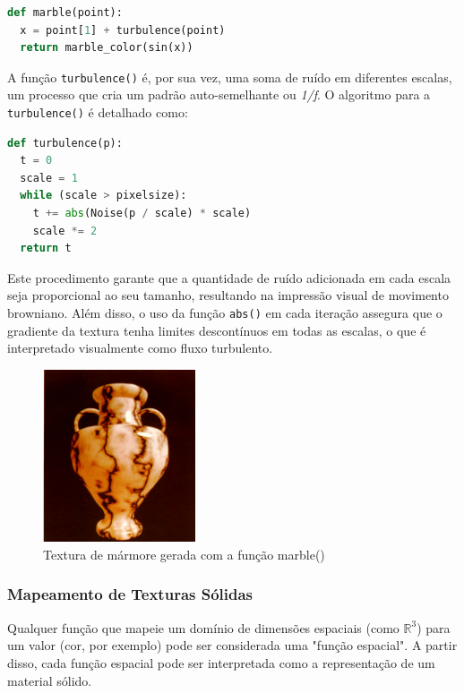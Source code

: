 \begin{lstlisting}[language=Python, caption={Pseudocódigo da função marble()}]
def marble(point):
  x = point[1] + turbulence(point)
  return marble_color(sin(x))
\end{lstlisting}

A função \texttt{turbulence()} é, por sua vez, uma soma de ruído em diferentes escalas, um processo que cria um padrão auto-semelhante ou \textit{1/f}. O algoritmo para a \texttt{turbulence()} é detalhado como:

\begin{lstlisting}[language=Python, caption={Pseudocódigo da função turbulence()}]
def turbulence(p):
  t = 0
  scale = 1
  while (scale > pixelsize):
    t += abs(Noise(p / scale) * scale)
    scale *= 2
  return t
\end{lstlisting}

Este procedimento garante que a quantidade de ruído adicionada em cada escala seja proporcional ao seu tamanho, resultando na impressão visual de movimento browniano. Além disso, o uso da função \texttt{abs()} em cada iteração assegura que o gradiente da textura tenha limites descontínuos em todas as escalas, o que é interpretado visualmente como fluxo turbulento.

\begin{figure}[H]
    \centering
    \includegraphics[width=0.4\textwidth]{img/marble.png}
    \caption{Textura de mármore gerada com a função marble()}
    \label{fig:marble_texture}
\end{figure}


\subsubsection{Mapeamento de Texturas Sólidas}
Qualquer função que mapeie um domínio de dimensões espaciais (como $\mathbb{R}^3$) para um valor (cor, por exemplo) pode ser considerada uma "função espacial". A partir disso, cada função espacial pode ser interpretada como a representação de um material sólido.

